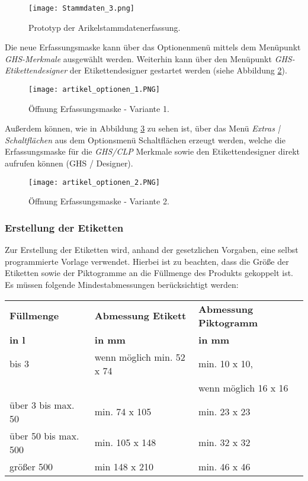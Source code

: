 \begin{figure}[H]
    \centering
    \texttt{[image: Stammdaten\_3.png]}
    \caption[Prototyp der Arikelstammdatenerfassung]
    {\small{Prototyp der Arikelstammdatenerfassung. \cite{fzp}}}
    \label{fig:prototyparikelstammdatenerfassung}
\end{figure}

\noindent
Die neue Erfassungsmaske kann über das Optionenmenü mittels dem Menüpunkt
\emph{GHS-Merkmale} ausgewählt werden. Weiterhin kann über den Menüpunkt
\emph{GHS-Etikettendesigner} der Etikettendesigner gestartet werden (siehe 
Abbildung \ref{fig:openerfassungsmaske1}).

\begin{figure}[H]
    \centering
    \texttt{[image: artikel\_optionen\_1.PNG]}
    \caption[Öffnung Erfassungsmaske - Variante 1]
    {\small{Öffnung Erfassungsmaske - Variante 1. \cite{fzp}}}
    \label{fig:openerfassungsmaske1}
\end{figure}

\noindent
Außerdem können, wie in Abbildung \ref{fig:openerfassungsmaske2} zu sehen ist, 
über das Menü \emph{Extras | Schaltflächen} aus dem Optionsmenü 
Schaltflächen erzeugt werden, welche die Erfassungsmaske für die \emph{GHS/CLP} 
Merkmale sowie den Etikettendesigner direkt aufrufen können (GHS / Designer).

\begin{figure}[H]
    \centering
    \texttt{[image: artikel\_optionen\_2.PNG]}
    \caption[Öffnung Erfassungsmaske - Variante 2]
    {\small{Öffnung Erfassungsmaske - Variante 2. \cite{fzp}}}
    \label{fig:openerfassungsmaske2}
\end{figure}

\subsubsection{Erstellung der Etiketten}
\label{subsubsec:erstellungetiketten}
Zur Erstellung der Etiketten wird, anhand der gesetzlichen Vorgaben, eine selbst programmierte 
Vorlage verwendet. Hierbei ist zu beachten, dass die Größe der Etiketten sowie der Piktogramme 
an die Füllmenge des Produkts gekoppelt ist. Es müssen folgende Mindestabmessungen berücksichtigt 
werden:

\begin{table}[H]
\begin{tabular}{|l|l|l|}\hline
 \textbf{Füllmenge} & \textbf{Abmessung Etikett} & \textbf{Abmessung Piktogramm} \\
 \textbf{in l} & \textbf{in mm} & \textbf{in mm} \\ \hline
 bis 3 & wenn möglich min. 52 x 74 & min. 10 x 10, \\ & & wenn möglich 16 x 16 \\ \hline
 über 3 bis max. 50 & min. 74 x 105 & min. 23 x 23 \\ \hline
 über 50 bis max. 500 & min. 105 x 148 & min. 32 x 32 \\ \hline
 größer 500 & min 148 x 210 & min. 46 x 46 \\ \hline
\end{tabular}
\end{table}

